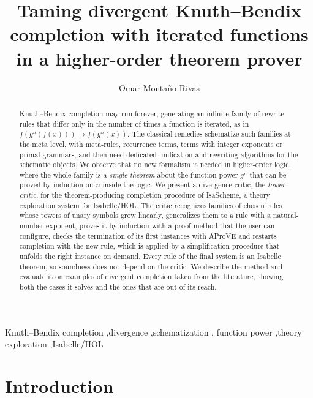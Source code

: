 \documentclass[preprint,12pt]{elsarticle}
\newcommand{\rw}{\to}
\newcommand{\pw}[2]{#1^{#2}}               %
\begin{document}
\begin{frontmatter}

\title{Taming divergent Knuth--Bendix completion with iterated functions
in a higher-order theorem prover}

\author[aff]{Omar Monta\~{n}o-Rivas}
\address[aff]{Affiliation to be completed}

\begin{abstract}
Knuth--Bendix completion may run forever, generating an infinite family of
rewrite rules that differ only in the number of times a function is
iterated, as in $f(\pw{g}{n}(f(x))) \rw f(\pw{g}{n}(x))$. The classical
remedies schematize such families at the meta level, with meta-rules,
recurrence terms, terms with integer exponents or primal grammars, and then
need dedicated unification and rewriting algorithms for the schematic
objects. We observe that no new formalism is needed in higher-order logic,
where the whole family is a \emph{single theorem} about the function power
$g^n$ that can be proved by induction on $n$ inside the logic. We
present a divergence critic, the \emph{tower critic}, for the theorem-producing completion
procedure of IsaScheme, a theory exploration system for Isabelle/HOL. The
critic recognizes families of chosen rules whose towers of unary symbols
grow linearly, generalizes them to a rule with a natural-number exponent,
proves it by induction with a proof method that the user can configure,
checks the termination of its first instances with
AProVE and restarts completion with the new rule, which is applied by a
simplification procedure that unfolds the right instance on demand. Every
rule of the final system is an Isabelle theorem, so soundness does not
depend on the critic. We describe the method and evaluate it on examples of
divergent completion taken from the literature, showing both the cases it
solves and the ones that are out of its reach.
\end{abstract}

\begin{keyword}
Knuth--Bendix completion \sep divergence \sep schematization \sep
function power \sep theory exploration \sep Isabelle/HOL
\end{keyword}

\end{frontmatter}

\section{Introduction}
\end{document}

